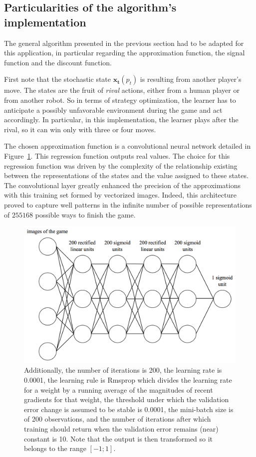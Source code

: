 \documentclass[scrartcl, 10.5 pt, conference]{ieeeconf}
\newcommand{\B}[1]{\mathbf{#1}}
\begin{document}
\subsection{Particularities of the algorithm's implementation}

The general algorithm presented in the previous section had to be adapted for this application, in particular regarding the approximation function, the signal function and the discount function.

First note that the stochastic state $\B{x_t}(p_t)$ is resulting from another player's move. The states are the fruit of \textit{rival} actions, either from a human player or from another robot. So in terms of strategy optimization, the learner has to anticipate a possibly unfavorable environment during the game and act accordingly. In particular, in this implementation, the learner plays after the rival, so it can win only with three or four moves.

The chosen approximation function is a convolutional neural network detailed in Figure~\ref{fig:neuralnet}. This regression function outputs real values. The choice for this regression function was driven by the complexity of the relationship existing between the representations of the states and the value assigned to these states. The convolutional layer greatly enhanced the precision of the approximations with this training set formed by vectorized images. Indeed, this architecture proved to capture well patterns in the infinite number of possible representations of $255168$ possible ways to finish the game.

\begin{figure}
\begin{center}
\includegraphics[scale=.3]{"NNview"}
\caption{Additionally, the number of iterations is 200, the learning rate is 0.0001, the learning rule is Rmsprop which divides the learning rate for a weight by a running average of the magnitudes of recent gradients for that weight, the threshold under which the validation error change is assumed to be stable is 0.0001, the mini-batch size is of 200 observations, and the number of iterations after which training should return when the validation error remains (near) constant is 10. Note that the output is then transformed so it belongs to the range $[-1;1]$.}
\label{fig:neuralnet}
\end{center}
\end{figure}
\end{document}
